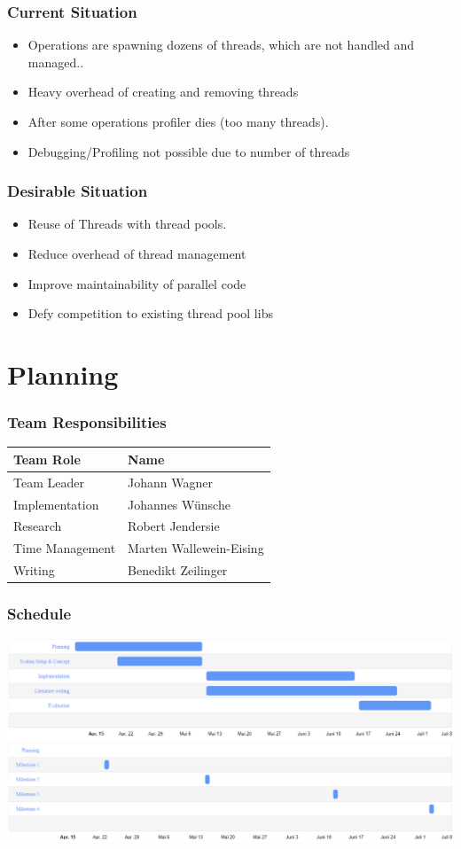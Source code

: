 \documentclass{beamer}
\begin{document}
	\begin{frame}
		\frametitle{Current Situation}
		\begin{itemize}
			\item Operations are spawning dozens of threads, which are not handled and managed..
			\item Heavy overhead of creating and removing threads
			\item After some operations profiler dies (too many threads).
			\item Debugging/Profiling not possible due to number of threads 
		\end{itemize}
	\end{frame}

	\begin{frame}
		\frametitle{Desirable Situation}
		\begin{itemize}
			\item Reuse of Threads with thread pools.
			\item Reduce overhead of thread management
			\item Improve maintainability of parallel code
			\item Defy competition to existing thread pool libs
		\end{itemize}
	\end{frame}

\section{Planning}

\begin{frame}
	\frametitle{Team Responsibilities}
		\centering
		\begin{tabular}{l l} \hline
			\textbf{Team Role} & \textbf{Name} \\ \hline
			Team Leader & Johann Wagner \\
			Implementation & Johannes Wünsche \\
			Research & Robert Jendersie \\
			Time Management & Marten Wallewein-Eising \\
			Writing & Benedikt Zeilinger\\ \hline
		\end{tabular}
\end{frame}

\begin{frame}
	\frametitle{Schedule}
	\includegraphics[width=1.0\textwidth]{img/schedule.png}
\end{frame}
\end{document}
